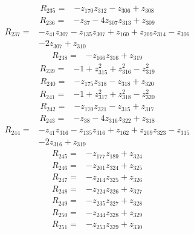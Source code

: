 \begin{align*}
R_{235}={}&-z_{170}z_{312}-z_{306}+z_{308}
\end{align*}
\begin{align*}
R_{236}={}&-z_{37}-4z_{307}z_{313}+z_{309}
\end{align*}
\begin{align*}
R_{237}={}&-z_{41}z_{307}-z_{135}z_{307}+z_{160}+z_{209}z_{314}-z_{306}\\
&-2z_{307}+z_{310}
\end{align*}
\begin{align*}
R_{238}={}&-z_{166}z_{316}+z_{319}
\end{align*}
\begin{align*}
R_{239}={}&-1+z_{315}^{2}+z_{316}^{2}-z_{319}^{2}
\end{align*}
\begin{align*}
R_{240}={}&-z_{175}z_{318}-z_{318}+z_{320}
\end{align*}
\begin{align*}
R_{241}={}&-1+z_{317}^{2}+z_{318}^{2}-z_{320}^{2}
\end{align*}
\begin{align*}
R_{242}={}&-z_{170}z_{321}-z_{315}+z_{317}
\end{align*}
\begin{align*}
R_{243}={}&-z_{38}-4z_{316}z_{322}+z_{318}
\end{align*}
\begin{align*}
R_{244}={}&-z_{41}z_{316}-z_{135}z_{316}+z_{162}+z_{209}z_{323}-z_{315}\\
&-2z_{316}+z_{319}
\end{align*}
\begin{align*}
R_{245}={}&-z_{177}z_{189}+z_{324}
\end{align*}
\begin{align*}
R_{246}={}&-z_{201}z_{324}+z_{325}
\end{align*}
\begin{align*}
R_{247}={}&-z_{214}z_{325}+z_{326}
\end{align*}
\begin{align*}
R_{248}={}&-z_{224}z_{326}+z_{327}
\end{align*}
\begin{align*}
R_{249}={}&-z_{235}z_{327}+z_{328}
\end{align*}
\begin{align*}
R_{250}={}&-z_{244}z_{328}+z_{329}
\end{align*}
\begin{align*}
R_{251}={}&-z_{253}z_{329}+z_{330}
\end{align*}
